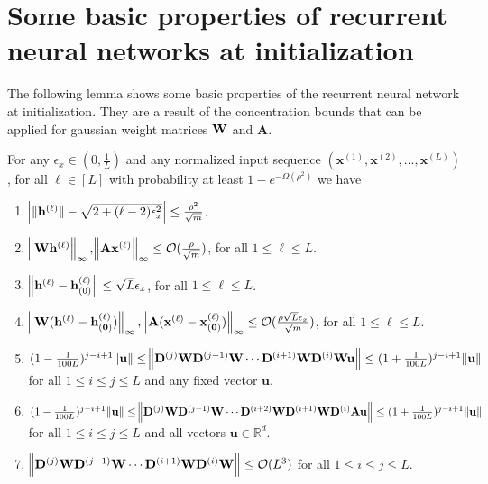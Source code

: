 \section{Some basic properties of recurrent neural networks at initialization}\label{sec:basic_prop}
The following lemma shows some basic properties of the recurrent neural network at initialization. They are a result of the concentration bounds that can be applied for gaussian weight matrices $\mathbf{W}$ and $\mathbf{A}$.
\begin{lemma}\label{lemma:norm_ESN}%
	For any $\epsilon_x \in (0, \frac{1}{L})$ and any normalized input sequence $(\mathbf{x}^{(1)}, \mathbf{x}^{(2)}, ..., \mathbf{x}^{(L)})$, for all $\ell \in [L]$ with probability at least $1-e^{-\Omega\left(\rho^2\right)}$ we have
	\begin{enumerate}
		\item $\abs{\norm[0]{\mathbf{h}^{(\ell)}} - \sqrt{2 + (\ell - 2)\epsilon_x^2}}  \le  \frac{\rho^2}{\sqrt{m}}$.
		\item $\norm{\mathbf{W}\mathbf{h}^{(\ell)}}_{\infty}, \norm{\mathbf{A}\mathbf{x}^{(\ell)}}_{\infty} \le \mathcal{O}(\frac{\rho}{\sqrt{m}})$, for all $1 \le 
		\ell \le L$.
		\item $\norm{\mathbf{h}^{(\ell)} - \mathbf{h}^{(\ell)}_{(0)}} \le \sqrt{L} \epsilon_x$, for all $1 \le 
		\ell \le L$.
		\item $\norm{\mathbf{\mathbf{W} (\mathbf{h}^{(\ell)} - \mathbf{h}_{(0)}^{(\ell)})}}_{\infty}, \norm{\mathbf{\mathbf{A} (\mathbf{x}^{(\ell)} - \mathbf{x}_{(0)}^{(\ell)})}}_{\infty} \le \mathcal{O}(\frac{\rho \sqrt{L} \epsilon_x}{\sqrt{m}})$, for all $1 \le 
		\ell \le L$. 
		\item $(1 - \frac{1}{100L})^{j-i+1} \norm{\mathbf{u}} \le \norm{\mathbf{D}^{(j)} \mathbf{W} \mathbf{D}^{(j-1)} \mathbf{W} \cdots \mathbf{D}^{(i+1)} \mathbf{W} \mathbf{D}^{(i)} \mathbf{W} \mathbf{u}} \le (1 + \frac{1}{100L})^{j-i+1} \norm{\mathbf{u}}$ for all $1 \le i \le j \le L$ and any fixed vector $\mathbf{u}$.
		\item $(1 - \frac{1}{100L})^{j-i+1} \norm{\mathbf{u}} \le \norm{\mathbf{D}^{(j)} \mathbf{W} \mathbf{D}^{(j-1)} \mathbf{W} \cdots \mathbf{D}^{(i+2)} \mathbf{W} \mathbf{D}^{(i+1)} \mathbf{W} \mathbf{D}^{(i)} \mathbf{A} \mathbf{u} } \le (1 + \frac{1}{100L})^{j-i+1} \norm{\mathbf{u}}$ for all $1 \le i \le j \le L$ and all vectors $\mathbf{u} \in \mathbb{R}^{d}$.
		\item $\norm{\mathbf{D}^{(j)} \mathbf{W} \mathbf{D}^{(j-1)} \mathbf{W} \cdots \mathbf{D}^{(i+1)} \mathbf{W} \mathbf{D}^{(i)} \mathbf{W}} \le \mathcal{O}(L^3)$ for all $1 \le i \le j \le L$.

\end{enumerate}
\end{lemma}
